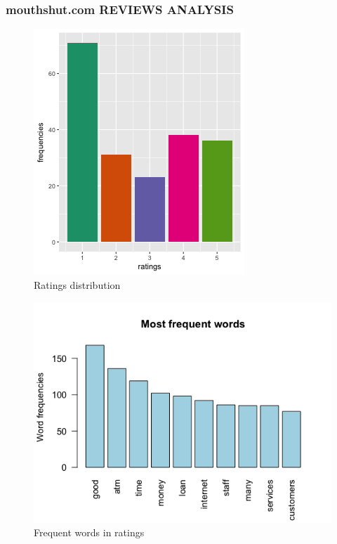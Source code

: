 \documentclass[a4paper, 12pt]{extarticle}
\begin{document}
{\subsubsection{mouthshut.com REVIEWS ANALYSIS}
\begin{figure}[H]
\centering
\includegraphics[scale=1]{ratings_distribution.png}
\caption{Ratings distribution}
\end{figure}

\begin{figure}[H]
\centering
\includegraphics[scale=0.5]{freq_words.png}
\caption{Frequent words in ratings}
\end{figure}

}
\end{document}
